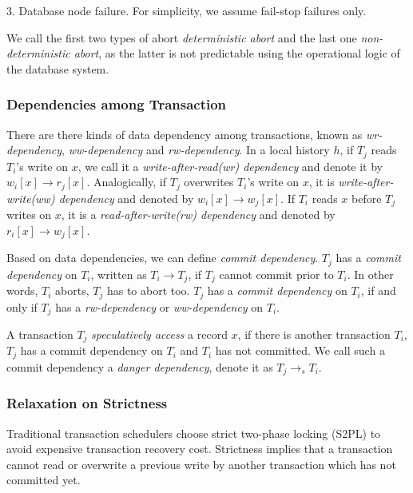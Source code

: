 \documentclass[conference]{IEEEtran}
\begin{document}
3. Database node failure. For simplicity, we assume fail-stop failures only.

We call the first two types of abort \emph{deterministic abort} and the last one \emph{non-deterministic abort}, 
as the latter is not predictable using the operational logic of the database system.

\subsubsection{Dependencies among Transaction}

There are there kinds of data dependency among transactions, known as \emph{wr-dependency}, \emph{ww-dependency} and \emph{rw-dependency}.
In a local history ${h}$, if ${T_j}$ reads ${T_i}$'s write on ${x}$,
we call it a \emph{write-after-read(wr) dependency} and denote it by ${w_i[x] \rightarrow r_j[x]}$.
Analogically, if ${T_j}$ overwrites ${T_i}$'s write on ${x}$, it is \emph{write-after-write(ww) dependency} and denoted by ${w_i[x] \rightarrow w_j[x]}$.
If ${T_i}$ reads ${x}$ before ${T_j}$ writes on ${x}$, it is a \emph{read-after-write(rw) dependency} and denoted by ${r_i[x] \rightarrow w_j[x]}$.

Based on data dependencies, we can define \emph{commit dependency}. ${T_j}$ has a \emph{commit dependency} on ${T_i}$, written as ${T_i \rightarrow T_j}$, if ${T_j}$ cannot commit prior to ${T_i}$.
In other words, ${T_i}$ aborts, ${T_j}$ has to abort too. ${T_j}$ has a \emph{commit dependency} on ${T_i}$, if and only if ${T_j}$ has a \emph{rw-dependency} or \emph{ww-dependency} on ${T_i}$.

A transaction ${T_j}$ \emph{speculatively access} a record ${x}$, if there is another transaction ${T_i}$,
${T_j}$ has a commit dependency on ${T_i}$ and  ${T_i}$ has not committed.
We call such a commit dependency a \emph{danger dependency}, denote it as ${T_j \rightarrow_s T_i}$.

\subsubsection{Relaxation on Strictness}

Traditional transaction schedulers choose strict two-phase locking (S2PL) \cite{DBLP:conf/vldb/Raz92} to avoid expensive transaction recovery cost.
Strictness implies that a transaction cannot read or overwrite a previous write by another transaction which has not committed yet.
\end{document}
